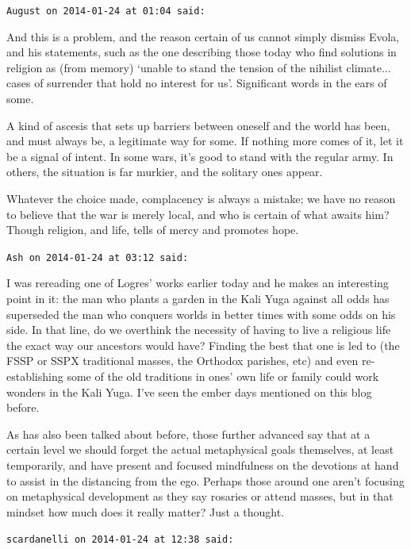 \begin{footnotesize}
\begin{sffamily}
\texttt{August on 2014-01-24 at 01:04 said:}

And this is a problem, and the reason certain of us cannot simply dismiss Evola, and his statements, such as the one describing those today who find solutions in religion as (from memory) `unable to stand the tension of the nihilist climate... cases of surrender that hold no interest for us'. Significant words in the ears of some.

A kind of ascesis that sets up barriers between oneself and the world has been, and must always be, a legitimate way for some. If nothing more comes of it, let it be a signal of intent. In some wars, it's good to stand with the regular army. In others, the situation is far murkier, and the solitary ones appear.

Whatever the choice made, complacency is always a mistake; we have no reason to believe that the war is merely local, and who is certain of what awaits him? Though religion, and life, tells of mercy and promotes hope.

\hfill

\texttt{Ash on 2014-01-24 at 03:12 said:}

I was rereading one of Logres' works earlier today and he makes an interesting point in it: the man who plants a garden in the Kali Yuga against all odds has superseded the man who conquers worlds in better times with some odds on his side. In that line, do we overthink the necessity of having to live a religious life the exact way our ancestors would have? Finding the best that one is led to (the FSSP or SSPX traditional masses, the Orthodox parishes, etc) and even re-establishing some of the old traditions in ones' own life or family could work wonders in the Kali Yuga. I've seen the ember days mentioned on this blog before.

As has also been talked about before, those further advanced say that at a certain level we should forget the actual metaphysical goals themselves, at least temporarily, and have present and focused mindfulness on the devotions at hand to assist in the distancing from the ego. Perhaps those around one aren't focusing on metaphysical development as they say rosaries or attend masses, but in that mindset how much does it really matter? Just a thought.

\hfill

\texttt{scardanelli on 2014-01-24 at 12:38 said:}


\end{sffamily}
\end{footnotesize}
